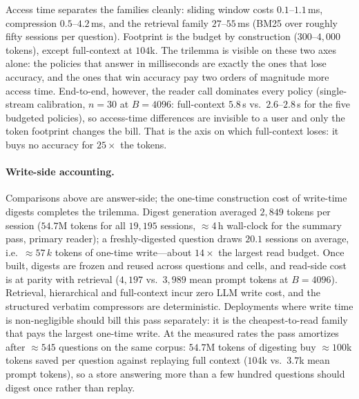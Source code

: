 \documentclass{article} %
\newcommand{\eTwoERange}{full-context $5.8$\,s vs.\ $2.6$--$2.8$\,s for the five budgeted policies}
\begin{document}
\begin{table}[h]
\centering\scriptsize
\caption{Memory-access latency (ms; median over the $500$ assemblies) and memory footprint
(tokens; mean) per policy and budget, primary reader. End-to-end latency is measured
separately in a single-stream calibration (text). Source \texttt{tables500/latency.tex}.}
\label{tab:latency}

\end{table}

Access time separates the families cleanly: sliding window costs $0.1$--$1.1$\,ms,
compression $0.5$--$4.2$\,ms, and the retrieval family $27$--$55$\,ms (BM25 over roughly
fifty sessions per question). Footprint is the budget by construction ($300$--$4{,}000$
tokens), except full-context at $104$k. The trilemma is visible on these two axes alone: the
policies that answer in milliseconds are exactly the ones that lose accuracy, and the ones
that win accuracy pay two orders of magnitude more access time. End-to-end, however, the
reader call dominates every policy (single-stream calibration, $n{=}30$ at $B{=}4096$:
\eTwoERange{}), so access-time differences are invisible to a user and only the token
footprint changes the bill. That is the axis on which full-context loses: it buys no
accuracy for $25\times$ the tokens.

\paragraph{Write-side accounting.} Comparisons above are answer-side; the one-time
construction cost of write-time digests completes the trilemma. Digest generation averaged
$2{,}849$ tokens per session ($54.7$M tokens for all $19{,}195$ sessions, $\approx$4\,h
wall-clock for the summary pass, primary reader); a freshly-digested question draws $20.1$
sessions on average, i.e.\ $\approx 57\,k$ tokens of one-time write---about
$14\times$ the largest read budget. Once built, digests are frozen and reused across questions
and cells, and read-side cost is at parity with retrieval ($4{,}197$ vs.\ $3{,}989$ mean
prompt tokens at $B{=}4096$). Retrieval, hierarchical and full-context incur zero LLM write
cost, and the structured verbatim compressors are deterministic. Deployments where write
time is non-negligible should bill this pass separately: it is the cheapest-to-read family
that pays the largest one-time write. At the measured rates the pass amortizes after
$\approx 545$ questions on the same corpus: $54.7$M tokens of digesting buy $\approx 100$k
tokens saved per question against replaying full context ($104$k vs.\ $3.7$k mean prompt
tokens), so a store answering more than a few hundred questions should digest once rather
than replay.
\end{document}
